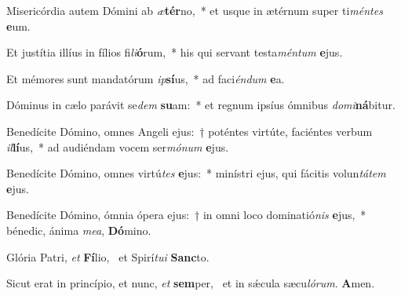 \item Misericórdia autem Dómini ab \textit{æ}\textbf{tér}no,~* et usque in ætérnum super ti\textit{mén}\textit{tes} \textbf{e}um.
\item Et justítia illíus in fílios fi\textit{li}\textbf{ó}rum,~* his qui servant testa\textit{mén}\textit{tum} \textbf{e}jus.
\item Et mémores sunt mandatórum \textit{ip}\textbf{sí}us,~* ad faci\textit{én}\textit{dum} \textbf{e}a.
\item Dóminus in cælo parávit se\textit{dem} \textbf{su}am:~* et regnum ipsíus ómnibus \textit{do}\textit{mi}\textbf{ná}bitur.
\item Benedícite Dómino, omnes Angeli ejus:~† poténtes virtúte, faciéntes verbum \textit{il}\textbf{lí}us,~* ad audiéndam vocem ser\textit{mó}\textit{num} \textbf{e}jus.
\item Benedícite Dómino, omnes virtú\textit{tes} \textbf{e}jus:~* minístri ejus, qui fácitis volun\textit{tá}\textit{tem} \textbf{e}jus.
\item Benedícite Dómino, ómnia ópera ejus:~† in omni loco dominatió\textit{nis} \textbf{e}jus,~* bénedic, ánima \textit{me}\textit{a}, \textbf{Dó}mino.
\item Glória Patri, \textit{et} \textbf{Fí}lio,~\psstar{} et Spirí\textit{tu}\textit{i} \textbf{Sanc}to.
\item Sicut erat in princípio, et nunc, \textit{et} \textbf{sem}per,~\psstar{} et in sǽcula sæcu\textit{ló}\textit{rum}. \textbf{A}men.